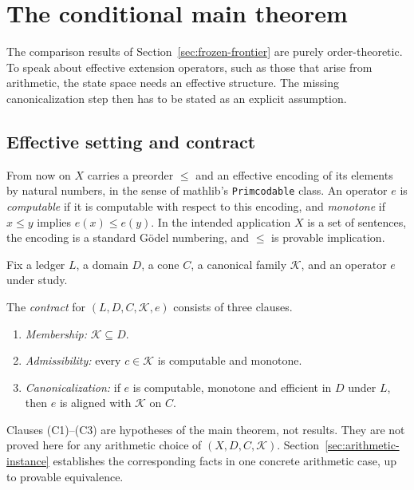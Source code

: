 \section{The conditional main theorem}\label{sec:conditional-lift}

The comparison results of Section~\ref{sec:frozen-frontier} are purely order-theoretic. To speak about effective extension operators, such as those that arise from arithmetic, the state space needs an effective structure. The missing canonicalization step then has to be stated as an explicit assumption.

\subsection{Effective setting and contract}

From now on $X$ carries a preorder $\le$ and an effective encoding of its elements by natural numbers, in the sense of mathlib's \texttt{Primcodable} class. An operator $e$ is \emph{computable} if it is computable with respect to this encoding, and \emph{monotone} if $x\le y$ implies $e(x)\le e(y)$. In the intended application $X$ is a set of sentences, the encoding is a standard G\"odel numbering, and $\le$ is provable implication.

Fix a ledger $L$, a domain $D$, a cone $C$, a canonical family $\mathcal{K}$, and an operator $e$ under study.

\begin{definition}[Contract]\label{def:contract}
The \emph{contract} for $(L,D,C,\mathcal{K},e)$ consists of three clauses.
\begin{enumerate}
\item[\textup{(C1)}] \emph{Membership:} $\mathcal{K}\subseteq D$.
\item[\textup{(C2)}] \emph{Admissibility:} every $c\in\mathcal{K}$ is computable and monotone.
\item[\textup{(C3)}] \emph{Canonicalization:} if $e$ is computable, monotone and efficient in $D$ under $L$, then $e$ is aligned with $\mathcal{K}$ on $C$.
\end{enumerate}
\end{definition}

Clauses (C1)--(C3) are hypotheses of the main theorem, not results. They are not proved here for any arithmetic choice of $(X,D,C,\mathcal{K})$. Section~\ref{sec:arithmetic-instance} establishes the corresponding facts in one concrete arithmetic case, up to provable equivalence.

